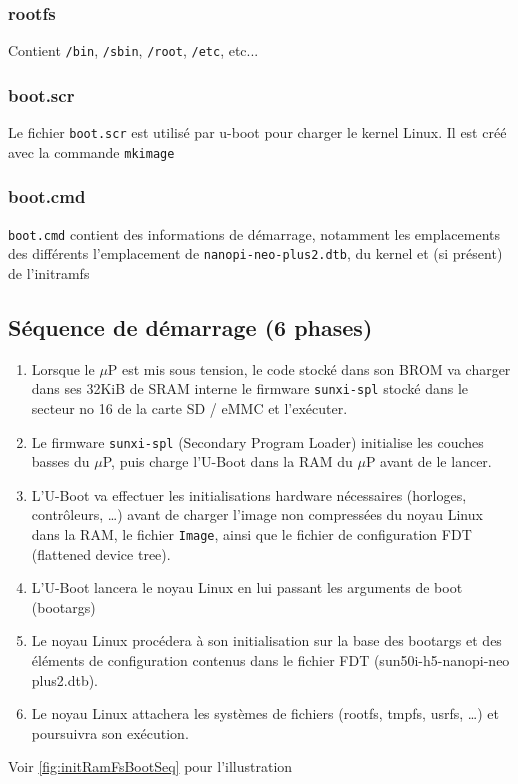 \subsubsection{rootfs}
Contient \verb!/bin!, \verb!/sbin!, \verb!/root!, \verb!/etc!, etc...
\subsubsection{boot.scr}
Le fichier \verb!boot.scr! est utilisé par u-boot pour charger le kernel Linux. Il est créé avec la commande \verb!mkimage!
\subsubsection{boot.cmd}
\verb!boot.cmd! contient des informations de démarrage, notamment les emplacements des différents l'emplacement de \verb!nanopi-neo-plus2.dtb!, du kernel et (si présent) de l'initramfs

\subsection{Séquence de démarrage (6 phases)}
\begin{enumerate}
\item Lorsque le $\mu$P est mis sous tension, le code stocké dans son BROM va charger dans ses 32KiB de SRAM interne le firmware \verb!sunxi-spl! stocké dans le secteur no 16 de la carte SD / eMMC et l’exécuter. 
\item Le firmware \verb!sunxi-spl! (Secondary Program Loader) initialise les couches basses du $\mu$P, puis charge l'U-Boot dans la RAM du $\mu$P avant de le lancer.
\item L'U-Boot va effectuer les initialisations hardware nécessaires (horloges, contrôleurs, …) avant de charger l’image non compressées du noyau Linux dans la RAM, le fichier \verb!Image!, ainsi que le fichier de configuration FDT (flattened device tree).
\item L'U-Boot lancera le noyau Linux en lui passant les arguments de boot (bootargs)
\item Le noyau Linux procédera à son initialisation sur la base des bootargs et des éléments de configuration contenus dans le fichier FDT (sun50i-h5-nanopi-neo plus2.dtb).
\item Le noyau Linux attachera les systèmes de fichiers (rootfs, tmpfs, usrfs, …) et poursuivra son exécution.
\end{enumerate}

Voir \ref{fig:initRamFsBootSeq} pour l'illustration